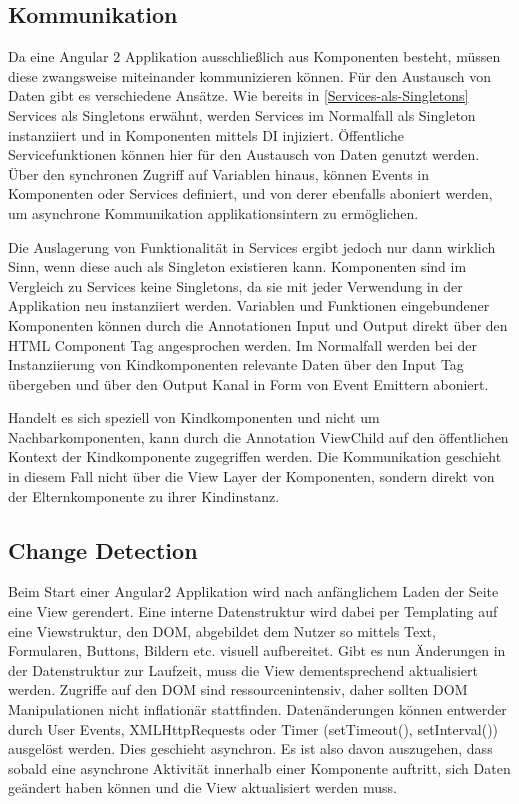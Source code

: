 \vspace{1cm}

\vspace{1cm}

\subsection{Kommunikation}

Da eine Angular 2 Applikation ausschließlich aus Komponenten besteht, müssen diese zwangsweise miteinander
kommunizieren können. Für den Austausch von Daten gibt es verschiedene Ansätze.
Wie bereits in \ref{Services-als-Singletons} Services als Singletons erwähnt, werden Services im Normalfall als Singleton
instanziiert und in Komponenten mittels \ac{DI} injiziert. Öffentliche Servicefunktionen können hier für den
Austausch von Daten genutzt werden. Über den synchronen Zugriff auf Variablen hinaus,
können Events in Komponenten oder Services definiert, und von derer ebenfalls aboniert werden,
um asynchrone Kommunikation applikationsintern zu ermöglichen.

Die Auslagerung von Funktionalität in Services ergibt jedoch nur dann wirklich Sinn,
wenn diese auch als Singleton existieren kann. Komponenten sind im Vergleich zu Services keine Singletons,
da sie mit jeder Verwendung in der Applikation neu instanziiert werden.
Variablen und Funktionen eingebundener Komponenten können durch die Annotationen Input und Output
direkt über den HTML Component Tag angesprochen werden. Im Normalfall werden bei der Instanziierung von Kindkomponenten
relevante Daten über den Input Tag übergeben und über den Output Kanal in Form von Event Emittern aboniert. \cite{Angul94:online}

Handelt es sich speziell von Kindkomponenten und nicht um Nachbarkomponenten,
kann durch die Annotation ViewChild auf den öffentlichen Kontext der Kindkomponente zugegriffen werden.
Die Kommunikation geschieht in diesem Fall nicht über die View Layer der Komponenten,
sondern direkt von der Elternkomponente zu ihrer Kindinstanz. \cite{ViewC61:online}


\subsection{Change Detection}

Beim Start einer Angular2 Applikation wird nach anfänglichem Laden der Seite eine View gerendert.
Eine interne Datenstruktur wird dabei per Templating auf eine Viewstruktur, den DOM, abgebildet dem Nutzer so mittels Text,
Formularen, Buttons, Bildern etc. visuell aufbereitet.
Gibt es nun Änderungen in der Datenstruktur zur Laufzeit, muss die View dementsprechend aktualisiert werden.
Zugriffe auf den DOM sind ressourcenintensiv, daher sollten DOM Manipulationen nicht inflationär stattfinden.
Datenänderungen können entwerder durch User Events, XMLHttpRequests oder Timer (setTimeout(), setInterval()) ausgelöst werden.
Dies geschieht asynchron. Es ist also davon auszugehen, dass sobald eine asynchrone Aktivität innerhalb einer Komponente auftritt,
sich Daten geändert haben können und die View aktualisiert werden muss.
\cite{changedetection-explained}


